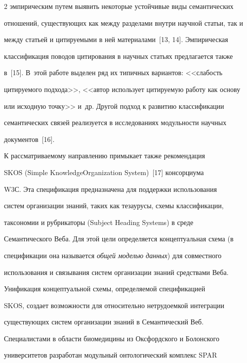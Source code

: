 \begin{multicols}{2}
эмпирическим путем выявить некоторые устойчивые виды семантических 


отношений, существующих как между разделами внутри научной статьи, так и 


между статьей и цитируемыми в ней материалами~[13, 14]. Эмпирическая 


классификация поводов цитирования в научных статьях предлагается также 


в~[15]. В~этой работе выделен ряд их типичных вариантов: <<слабость 


цитируемого подхода>>, <<автор использует цитируемую работу как основу 


или исходную точку>> и~др. Другой подход к развитию классификации 


семантических связей реализуется в исследованиях модульности научных 


документов~[16]. 


  


  К рассматриваемому направлению примыкает также рекомендация 


{SKOS} ({Simple Knowledge\linebreak Organization System})~[17] консорциума 


{W3С}. Эта спецификация предназначена для поддержки использования 


систем организации знаний, таких как тезаурусы, схемы классификации, 


таксономии и руб\-ри\-ка\-то\-ры ({Subject Heading Systems}) в среде 


Семантического Веба. Для этой цели определяется концептуальная схема (в 


спецификации она называется \textit{общей моделью данных}) для совместного 


использования и связывания систем организации знаний средствами Веба. 


Унификация концептуальной схемы, определяемой спецификацией 


{SKOS}, создает возможности для относительно нетрудоемкой интеграции 


существующих систем организации знаний в Семантический Веб. 


  


  Специалистами в области биомедицины из Оксфордского и Болонского 


университетов разработан модульный онтологический комплекс {SPAR} 



\end{multicols}
